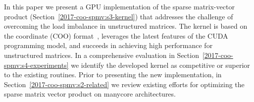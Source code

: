 In this paper we present
a GPU implementation 
of the sparse matrix-vector product (Section~\ref{2017-coo-spmv:s3-kernel})
that addresses the challenge of overcoming the load imbalance in unstructured
matrices. The kernel is based on the coordinate (COO) format~\cite{garlandspmv}, 
leverages the latest features of the CUDA programming model,
and succeeds in achieving high performance for unstructured matrices.
In a comprehensive evaluation in Section~\ref{2017-coo-spmv:s4-experiments} 
we identify the developed kernel as competitive or superior
to the existing routines.
Prior to presenting the new implementation, in Section~\ref{2017-coo-spmv:s2-related} we
review
existing efforts for optimizing the sparse matrix vector product
on manycore architectures.
